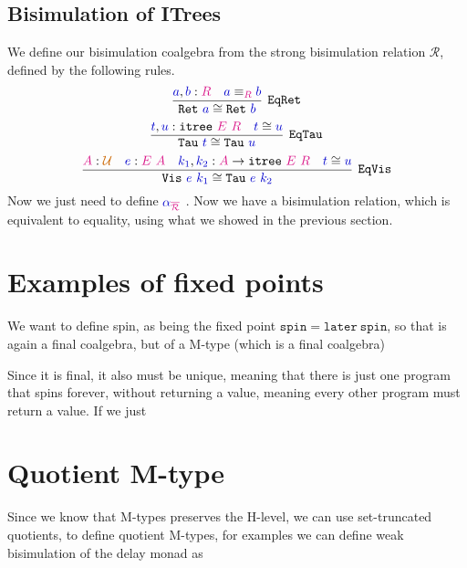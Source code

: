 \documentclass[twoside,11pt,openright]{report}
\newcommand*{\term}[1]{\textcolor{blue!80!black}{#1}}
\newcommand*{\type}[1]{\textcolor{magenta!90!black}{#1}}
\newcommand*{\universe}[1]{\textcolor{orange!80!black}{#1}}
\begin{document}
\subsection{Bisimulation of ITrees}
We define our bisimulation coalgebra from the strong bisimulation relation \(\mathcal{R}\), defined by the following rules.
\begin{equation}
  \infer[\mathtt{EqRet}]{\mathtt{Ret}~\term{a} \cong \mathtt{Ret}~\term{b}}{\term{a},\term{b} : \type{R} & \term{a} \equiv_{\type{R}} \term{b}}
\end{equation}
\begin{equation}
  \infer[\mathtt{EqTau}]{\mathtt{Tau}~\term{t} \cong \mathtt{Tau}~\term{u}}{\term{t},\term{u} : \mathtt{itree}~\type{E}~\type{R} & \term{t} \cong \term{u}}
\end{equation}
\begin{equation}
  \infer[\mathtt{EqVis}]{\mathtt{Vis}~\term{e}~\term{k_1} \cong \mathtt{Tau}~\term{e}~\term{k_2}}{\type{A} : \universe{\mathcal{U}} & \term{e} : \type{E}~\type{A} & \term{k_1},\term{k_2} : \type{A} \rightarrow \mathtt{itree}~\type{E}~\type{R} & \term{t} \cong \term{u}}
\end{equation}
Now we just need to define \(\term{\alpha}_{\type{\overline{\mathcal{R}}}}\) . Now we have a bisimulation relation, which is equivalent to equality, using what we showed in the previous section.

\section{Examples of fixed points}
We want to define spin, as being the fixed point \(\mathtt{spin} = \mathtt{later}~\mathtt{spin}\), so that is again a final coalgebra, but of a M-type (which is a final coalgebra)

\begin{figure}[h]
  \centering
\end{figure}
\noindent Since it is final, it also must be unique, meaning that there is just one program that spins forever, without returning a value, meaning every other program must return a value. If we just

\section{Quotient M-type}
Since we know that M-types preserves the H-level, we can use set-truncated quotients, to define quotient M-types, for examples we can define weak bisimulation of the delay monad as
\[\]
\end{document}

